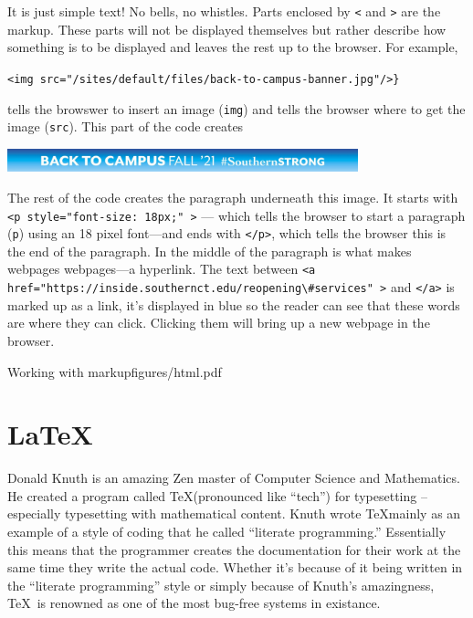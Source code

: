 \noindent It is just simple text! No bells, no whistles. Parts enclosed by \texttt{<}
and \texttt{>} are the markup. These parts will not be displayed themselves
but rather describe how something is to be displayed and leaves the
rest up to the browser. For example,

\begin{center}
\verb+<img src="/sites/default/files/back-to-campus-banner.jpg"/>}+
\par\end{center}

\noindent tells the browswer to insert an image ({\tt img}) and
tells the browser where to get the image ({\tt src}). This part
of the code creates

\begin{center}
\includegraphics[width=4in]{write/back-to-campus-banner}
\par\end{center}
  
\noindent The rest of the code creates the paragraph underneath this
image. It starts with \verb+<p style="font-size: 18px;" >+ --- which
tells the browser to start a paragraph ({\tt p}) using an 18 pixel
font---and ends with \verb+</p>+, which tells the browser this
is the end of the paragraph. In the middle of the paragraph is what
makes webpages webpages---a hyperlink. The text between 
\verb+<a href="https://inside.southernct.edu/reopening\#services" >+
and \verb+</a>+ is marked up as a link, it's displayed in blue so the reader can see that
these words are where they can click. Clicking them will bring up a new webpage in
the browser.
\clearpage

\begin{worksheet}{1}{Working with markup}{figures/html.pdf}

\end{worksheet}

\section{LaTeX}
\label{sec:latex}

Donald Knuth is an amazing Zen master of Computer Science and Mathematics.  He created a program called \TeX (pronounced like ``tech'') for typesetting -- especially typesetting with mathematical content.  Knuth wrote \TeX mainly as an example of a style of coding that he called ``literate programming.''  Essentially this means that the programmer creates the documentation for their work at the same time they write the actual code.  Whether it's because of it being written in the ``literate programming'' style or simply because of Knuth's amazingness, \TeX\  is renowned as one of the most bug-free systems in existance. 

